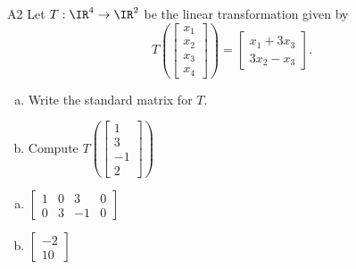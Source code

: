 \begin{problem}{A2}
Let $T: \IR^4 \rightarrow \IR^2$ be the linear transformation given by $$T\left(\begin{bmatrix} x_1 \\ x_2 \\ x_3 \\ x_4 \end{bmatrix} \right) = \begin{bmatrix} x_1+3x_3 \\ 3x_2-x_3 \end{bmatrix}.$$
\begin{enumerate}[(a)]
\item Write the standard matrix for $T$.
\item Compute \( T\left( \begin{bmatrix} 1 \\ 3 \\ -1 \\ 2 \end{bmatrix} \right) \)
\end{enumerate}
\end{problem}
\begin{solution}
\begin{enumerate}[(a)]
\item \(\begin{bmatrix} 1 & 0 & 3 & 0 \\ 0 & 3 & -1 & 0  \end{bmatrix}\)
\item \(\begin{bmatrix}  -2 \\ 10 \end{bmatrix}\)
\end{enumerate}
\end{solution}


